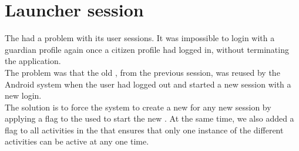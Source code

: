 
\section{Launcher session}
\label{sec:launcher_session_issues}

The \launcher had a problem with its user sessions. It was impossible to login with a guardian profile again once a citizen profile had logged in, without terminating the application. \\

The problem was that the old , from the previous session, was reused by the Android system when the user had logged out and started a new session with a new login.\\

The solution is to force the system to create a new  for any new session by applying a flag to the  used to start the new . At the same time, we also added a flag to all activities in the \launcher that ensures that only one instance of the different activities can be active at any one time.
